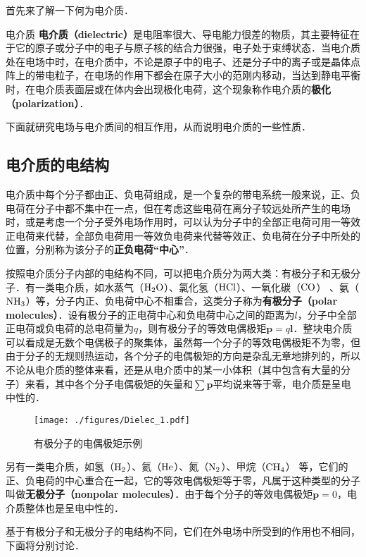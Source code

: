 
首先来了解一下何为电介质．
\begin{definition}{电介质}
\textbf{电介质（dielectric）}是电阻率很大、导电能力很差的物质，其主要特征在于它的原子或分子中的电子与原子核的结合力很强，电子处于束缚状态．当电介质处在电场中时，在电介质中，不论是原子中的电子、还是分子中的离子或是晶体点阵上的带电粒子，在电场的作用下都会在原子大小的范刚内移动，当达到静电平衡时，在电介质表面层或在体内会出现极化电荷，这个现象称作电介质的\textbf{极化（polarization）}．
\end{definition}
下面就研究电场与电介质间的相互作用，从而说明电介质的一些性质．

\subsection{电介质的电结构}

电介质中每个分子都由正、负电荷组成，是一个复杂的带电系统一般来说，正、负电荷在分子中都不集中在一点，但在考虑这些电荷在离分子较远处所产生的电场时，或是考虑一个分子受外电场作用时，可以认为分子中的全部正电荷可用一等效正电荷来代替，全部负电荷用一等效负电荷来代替等效正、负电荷在分子中所处的位置，分别称为该分子的\textbf{正负电荷“中心”}．

按照电介质分子内部的电结构不同，可以把电介质分为两大类：有极分子和无极分子．有一类电介质，如水蒸气（$\rm H_2O$）、氯化氢（$\rm HCl$）、一氧化碳（$\rm CO$） 、氨（$\rm NH_3$）等，分子内正、负电荷中心不相重合，这类分子称为\textbf{有极分子（polar molecules）}．设有极分子的正电荷中心和负电荷中心之间的距离为$l$，分子中全部正电荷或负电荷的总电荷量为$q$，则有极分子的等效电偶极矩$\mathbf p=q\mathbf l$．整块电介质可以看成是无数个电偶极子的聚集体，虽然每一个分子的等效电偶极矩不为零，但由于分子的无规则热运动，各个分子的电偶极矩的方向是杂乱无章地排列的，所以不论从电介质的整体来看，还是从电介质中的某一小体积（其中包含有大量的分子）来看，其中各个分子电偶极矩的矢量和$\sum \mathbf p$平均说来等于零，电介质是呈电中性的．
\begin{figure}[ht]
\centering
\texttt{[image: ./figures/Dielec\_1.pdf]}
\caption{有极分子的电偶极矩示例} \label{Dielec_fig1}
\end{figure}
另有一类电介质，如氢（$\rm H_2$）、氦（$\rm He$）、氮（$\rm N_2$）、甲烷（$\rm CH_4$） 等，它们的正、负电荷的中心重合在一起，它的等效电偶极矩等于零，凡属于这种类型的分子叫做\textbf{无极分子（nonpolar molecules）}．由于每个分子的等效电偶极矩$\mathbf p=0$，电介质整体也是呈电中性的．

基于有极分子和无极分子的电结构不同，它们在外电场中所受到的作用也不相同，下面将分别讨论．


